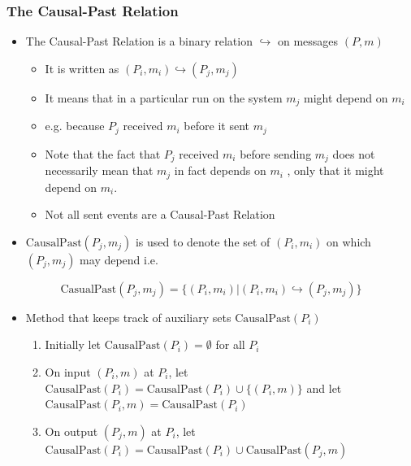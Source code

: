 \documentclass[11pt]{article}
\begin{document}
\subsubsection{The Causal-Past Relation}
\label{sec:orga02f70f}
\begin{itemize}
\item The Causal-Past Relation is a binary relation \(\hookrightarrow\) on messages \((P,m)\)
\begin{itemize}
\item It is written as \((P_i,m_i) \hookrightarrow (P_j,m_j)\)
\item It means that in a particular run on the system \(m_j\) might depend on \(m_i\)
\item e.g. because \(P_j\) received \(m_i\) before it sent \(m_j\)
\item Note that the fact that \(P_j\) received \(m_i\) before sending \(m_j\) does not necessarily mean that \(m_j\) in fact depends on \(m_i\) , only that it might depend on \(m_i\).
\item Not all sent events are a Causal-Past Relation
\end{itemize}

\item \(\text{CausalPast}(P_j,m_j)\) is used to denote the set of \((P_i,m_i)\) on which \((P_j,m_j)\) may depend i.e.
\end{itemize}
\begin{equation}
    \text{CasualPast}(P_j,m_j) = \{ (P_i,m_i) | (P_i,m_i) \hookrightarrow (P_j, m_j)\}
\end{equation}

\begin{itemize}
\item Method that keeps track of auxiliary sets \(\text{CausalPast}(P_i)\)
\begin{enumerate}
\item Initially let \(\text{CausalPast}(P_i) = \emptyset\) for all \(P_i\)
\item On input \((P_i,m)\) at \(P_i\), let \(\text{CausalPast}(P_i) = \text{CausalPast}(P_i) \cup \{(P_i,m)\}\) and let \(\text{CausalPast}(P_i,m)=\text{CausalPast}(P_i)\)
\item On output \((P_j,m)\) at \(P_i\), let \(\text{CausalPast}(P_i) = \text{CausalPast}(P_i) \cup \text{CausalPast}(P_j,m)\)
\end{enumerate}
\end{itemize}
\end{document}
